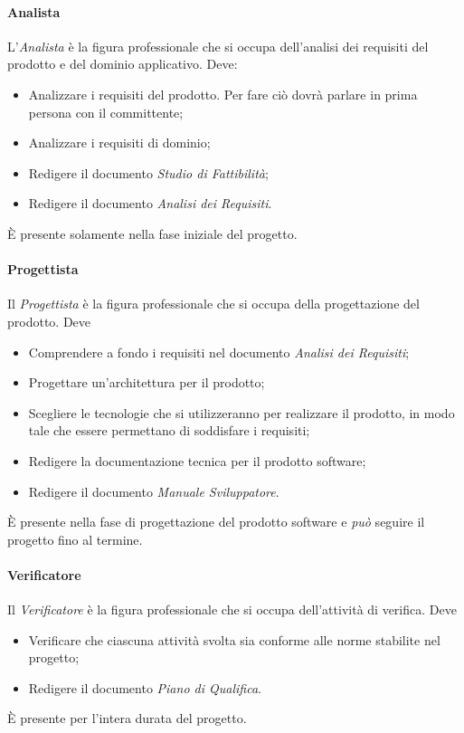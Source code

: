 \paragraph{Analista} \Spazio
L'\emph{Analista} è la figura professionale che si occupa dell'analisi dei requisiti del prodotto e del dominio applicativo. Deve:
\begin{itemize}
	\item Analizzare i requisiti del prodotto. Per fare ciò dovrà parlare in prima persona con il committente;
	\item Analizzare i requisiti di dominio;
	\item Redigere il documento \emph{Studio di Fattibilità};
	\item Redigere il documento \emph{Analisi dei Requisiti}.
\end{itemize}
È presente solamente nella fase iniziale del progetto.
\paragraph{Progettista} \Spazio
Il \emph{Progettista} è la figura professionale che si occupa della progettazione del prodotto. Deve
\begin{itemize}
	\item Comprendere a fondo i requisiti nel documento \emph{Analisi dei Requisiti};
	\item Progettare un'architettura per il prodotto;
	\item Scegliere le tecnologie che si utilizzeranno per realizzare il prodotto, in modo tale che essere permettano di soddisfare i requisiti;
	\item Redigere la documentazione tecnica per il prodotto software;
	\item Redigere il documento \emph{Manuale Sviluppatore}.
\end{itemize}
È presente nella fase di progettazione del prodotto software e \emph{può} seguire il progetto fino al termine.
\paragraph{Verificatore} \Spazio
Il \emph{Verificatore} è la figura professionale che si occupa dell'attività di verifica. Deve
\begin{itemize}
	\item Verificare che ciascuna attività svolta sia conforme alle norme stabilite nel progetto;
	\item Redigere il documento \emph{Piano di Qualifica}.
\end{itemize}
È presente per l'intera durata del progetto.
